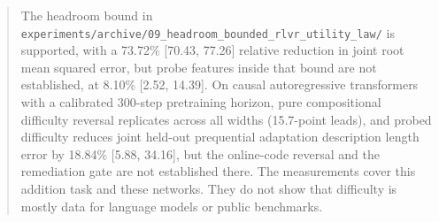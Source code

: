 \begin{abstract}
The headroom bound in \texttt{experiments/archive/09\_headroom\_bounded\_rlvr\_utility\_law/} is supported, with a 73.72\% [70.43, 77.26] relative reduction in joint root mean squared error, but probe features inside that bound are not established, at 8.10\% [2.52, 14.39].
On causal autoregressive transformers with a calibrated 300-step pretraining horizon, pure compositional difficulty reversal replicates across all widths (15.7-point leads), and probed difficulty reduces joint held-out prequential adaptation description length error by 18.84\% [5.88, 34.16], but the online-code reversal and the remediation gate are not established there.
The measurements cover this addition task and these networks.
They do not show that difficulty is mostly data for language models or public benchmarks.
\end{abstract}
